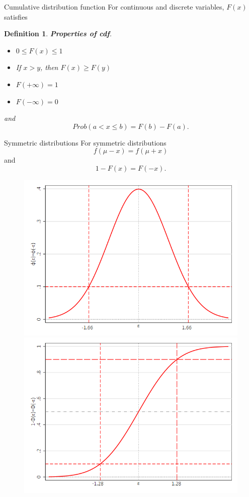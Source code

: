 \documentclass[11pt,table]{beamer}
\newtheorem{assumption}{Definition}
\begin{document}
\begin{frame}{Cumulative distribution function}
For continuous and discrete variables, $F(x)$ satisfies
\small
\begin{assumption} \textbf{Properties of cdf}. 
\begin{itemize}
	\item $0\leq F(x)\leq 1$
	\item If $x>y$, then $F(x)\geq F(y)$
	\item $F(+\infty)=1$
	\item $F(-\infty)=0$
\end{itemize}
and $$Prob(a< x\leq b)=F(b)-F(a).$$
\end{assumption}

\end{frame}


\begin{frame}{Symmetric distributions}
For symmetric distributions $$f(\mu - x) = f(\mu + x)$$
and $$1-F(x)=F(-x).$$
\begin{figure}[H]
\begin{center}
{\includegraphics[height=0.45\textheight]{figures/normal_pdf_sym}}\label{normal_pdf_sym}
{\includegraphics[height=0.45\textheight]{figures/normal_cdf_sym}}\label{normal_cdf_sym}
\end{center}
\end{figure}
\end{frame}
\end{document}
